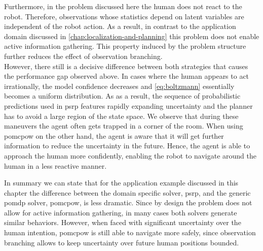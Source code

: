 Furthermore, in the problem discussed here the human does not react to the
robot. Therefore, observations whose statistics depend on latent variables are
independent of the robot action. As a result, in contrast to the application
domain discussed in \cref{chap:localization-and-planning} this problem does not
enable active information gathering. This property induced by the problem
structure further reduces the effect of observation branching.\\ However, there
still is a decisive difference between both strategies that causes the
performance gap observed above. In cases where the human appears to act
irrationally, the model confidence decreases and \cref{eq:boltzmann} essentially
becomes a uniform distribution. As as a result, the sequence of probabilistic
predictions used in \ac{psrp} features rapidly expanding uncertainty and the
planner has to avoid a large region of the state space. We observe that during
these maneuvers the agent often gets trapped in a corner of the room. When
using \ac{pomcpow} on the other hand, the agent is aware that it will get
further information to reduce the uncertainty in the future. Hence, the agent
is able to approach the human more confidently, enabling the robot to navigate
around the human in a less reactive manner.

In summary we can state that for the application example discussed in this
chapter the difference between the domain specific solver, \ac{psrp}, and the
generic \ac{pomdp} solver, \ac{pomcpow}, is less dramatic. Since by design the
problem does not allow for active information gathering, in many cases both
solvers generate similar behaviors. However, when faced with significant
uncertainty over the human intention, \ac{pomcpow} is still able to navigate
more safely, since observation branching allows to keep uncertainty over future
human positions bounded.

%  
%  
%  
%  
